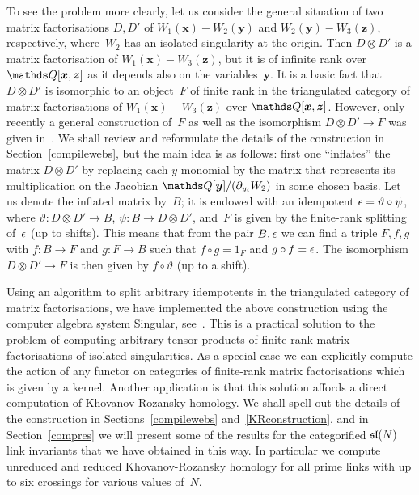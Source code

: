 \documentclass{compositio}
\theoremstyle{definition}
\numberwithin{equation}{section}
\begin{document}
To see the problem more clearly, let us consider the general situation of two matrix factorisations $D,D'$ of $W_{1}(\boldsymbol{x})-W_{2}(\boldsymbol{y})$ and $W_{2}(\boldsymbol{y})-W_{3}(\boldsymbol{z})$, respectively, where~$W_{2}$ has an isolated singularity at the origin. Then $D\otimes D'$ is a matrix factorisation of $W_{1}(\boldsymbol{x})-W_{3}(\boldsymbol{z})$, but it is of infinite rank over $\nQ[\boldsymbol{x},\boldsymbol{z}]$ as it depends also on the variables~$\boldsymbol{y}$. It is a basic fact that $D\otimes D'$ is isomorphic to an object~$F$ of finite rank in the triangulated category of matrix factorisations of $W_{1}(\boldsymbol{x})-W_{3}(\boldsymbol{z})$ over $\nQ[\boldsymbol{x},\boldsymbol{z}]$. However, only recently a general construction of~$F$ as well as the isomorphism $D\otimes D'\longrightarrow F$ was given in~\cite{dm1102.2957}. We shall review and reformulate the details of the construction in Section~\ref{compilewebs}, but the main idea is as follows:  first one ``inflates'' the matrix $D\otimes D'$ by replacing each $y$-monomial by the matrix that represents its multiplication on the Jacobian $\nQ[\boldsymbol{y}]/(\partial_{y_{i}} W_{2})$ in some chosen basis. Let us denote the inflated matrix by~$B$; it is endowed with an idempotent $\epsilon=\vartheta\circ\psi$, where $\vartheta: D\otimes D'\longrightarrow B$, $\psi: B\longrightarrow D\otimes D'$, and~$F$ is given by the finite-rank splitting of~$\epsilon$ (up to shifts). This means that from the pair $B,\epsilon$ we can find a triple $F,f,g$ with $f:B\longrightarrow F$ and $g:F\longrightarrow B$ such that $f\circ g=1_{F}$ and $g\circ f=\epsilon$. The isomorphism $D\otimes D'\longrightarrow F$ is then given by $f\circ\vartheta$ (up to a shift). 

Using an algorithm to split arbitrary idempotents in the triangulated category of matrix factorisations, we have implemented the above construction using the computer algebra system Singular, see~\cite{cmWebCompileCode}. This is a practical solution to the problem of computing arbitrary tensor products of finite-rank matrix factorisations of isolated singularities. As a special case we can explicitly compute the action of any functor on categories of finite-rank matrix factorisations which is given by a kernel. Another application is that this solution affords a direct computation of Khovanov-Rozansky homology. We shall spell out the details of the construction in Sections~\ref{compilewebs} and~\ref{KRconstruction}, and in Section~\ref{compres} we will present some of the results for the categorified $\mathfrak{sl}(N)$ link invariants that we have obtained in this way. In particular we compute unreduced and reduced Khovanov-Rozansky homology for all prime links with up to six crossings for various values of~$N$. 
\end{document}
